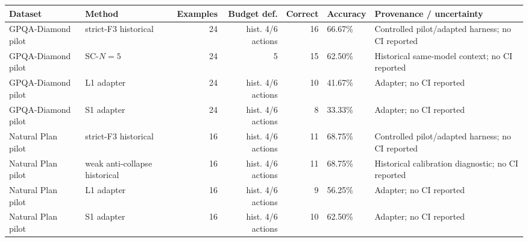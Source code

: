 \begin{tabular}{@{}llrrrlp{2.8cm}@{}}
\toprule
Dataset & Method & Examples & Budget def. & Correct & Accuracy & Provenance / uncertainty \\
\midrule
GPQA-Diamond pilot & strict-F3 historical & 24 & hist. 4/6 actions & 16 & 66.67\% & Controlled pilot/adapted harness; no CI reported \\
GPQA-Diamond pilot & SC-$N{=}5$ & 24 & 5 & 15 & 62.50\% & Historical same-model context; no CI reported \\
GPQA-Diamond pilot & L1 adapter & 24 & hist. 4/6 actions & 10 & 41.67\% & Adapter; no CI reported \\
GPQA-Diamond pilot & S1 adapter & 24 & hist. 4/6 actions & 8 & 33.33\% & Adapter; no CI reported \\
Natural Plan pilot & strict-F3 historical & 16 & hist. 4/6 actions & 11 & 68.75\% & Controlled pilot/adapted harness; no CI reported \\
Natural Plan pilot & weak anti-collapse historical & 16 & hist. 4/6 actions & 11 & 68.75\% & Historical calibration diagnostic; no CI reported \\
Natural Plan pilot & L1 adapter & 16 & hist. 4/6 actions & 9 & 56.25\% & Adapter; no CI reported \\
Natural Plan pilot & S1 adapter & 16 & hist. 4/6 actions & 10 & 62.50\% & Adapter; no CI reported \\
\bottomrule
\end{tabular}

